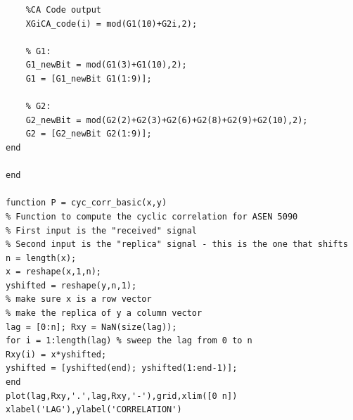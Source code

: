 \documentclass[11pt]{article}
\begin{document}
\begin{verbatim}
    %CA Code output
    XGiCA_code(i) = mod(G1(10)+G2i,2);

    % G1:
    G1_newBit = mod(G1(3)+G1(10),2);
    G1 = [G1_newBit G1(1:9)];
    
    % G2:
    G2_newBit = mod(G2(2)+G2(3)+G2(6)+G2(8)+G2(9)+G2(10),2);
    G2 = [G2_newBit G2(1:9)];
end

end

function P = cyc_corr_basic(x,y)
% Function to compute the cyclic correlation for ASEN 5090
% First input is the "received" signal
% Second input is the "replica" signal - this is the one that shifts
n = length(x);
x = reshape(x,1,n);
yshifted = reshape(y,n,1);
% make sure x is a row vector
% make the replica of y a column vector
lag = [0:n]; Rxy = NaN(size(lag));
for i = 1:length(lag) % sweep the lag from 0 to n
Rxy(i) = x*yshifted;
yshifted = [yshifted(end); yshifted(1:end-1)];
end
plot(lag,Rxy,'.',lag,Rxy,'-'),grid,xlim([0 n])
xlabel('LAG'),ylabel('CORRELATION')

\end{verbatim}
\end{document}
